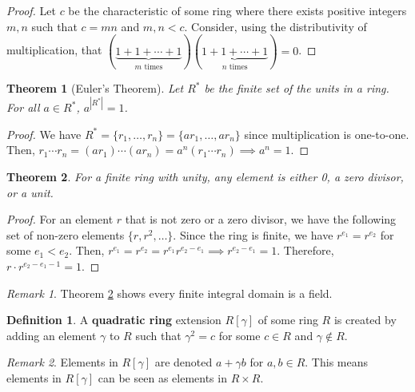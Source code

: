 \documentclass{article}
\newtheorem{theorem}{Theorem}[definition]
\theoremstyle{definition}
\newtheorem{definition}{Definition}[section]
\theoremstyle{remark}
\newtheorem{remark}{Remark}[definition]
\begin{document}
\begin{proof}
    Let $c$ be the characteristic of some ring where there exists positive
    integers $m,n$ such that $c=mn$ and $m,n<c$.
    Consider, using the distributivity of multiplication, that
    $(\underbrace{1+1+\cdots+1}_{m\text{ times}})(\underbrace{1+1+\cdots+1}_{n\text{ times}})=0$.
\end{proof}

\begin{theorem}[Euler's Theorem]
    Let $R^*$ be the finite set of the units in a ring.
    For all $a\in R^*$, $a^{|R^*|}=1$.
\end{theorem}

\begin{proof}
    We have $R^*=\{r_1,\dots,r_n\}=\{ar_1,\dots,ar_n\}$ since multiplication
    is one-to-one.
    Then, $r_1\cdots r_n=(ar_1)\cdots (ar_n)=a^n(r_1\cdots r_n)\implies a^n=1$.
\end{proof}

\begin{theorem}
    \label{thm:finite ring with unity}
    For a finite ring with unity, any element is either 0, a zero divisor, or a
    unit.
\end{theorem}

\begin{proof}
    For an element $r$ that is not zero or a zero divisor, we have the
    following set of non-zero elements $\{r,r^2,\dots\}$.
    Since the ring is finite, we have $r^{e_1}=r^{e_2}$ for some $e_1<e_2$.
    Then, $r^{e_1}=r^{e_2}=r^{e_1}r^{e_2-e_1}\implies r^{e_2-e_1}=1$.
    Therefore, $r\cdot r^{e_2-e_1-1}=1$.
\end{proof}

\begin{remark}
    Theorem \ref{thm:finite ring with unity} shows every finite integral domain
    is a field.
\end{remark}


\begin{definition}
    A \textbf{quadratic ring} extension $R[\gamma]$ of some ring $R$ is created
    by adding an element $\gamma$ to $R$ such that $\gamma^2=c$ for some
    $c\in R$ and $\gamma\notin R$.
\end{definition}

\begin{remark}
    Elements in $R[\gamma]$ are denoted $a+\gamma b$ for $a,b\in R$.
    This means elements in $R[\gamma]$ can be seen as elements in $R\times R$.
\end{remark}
\end{document}
